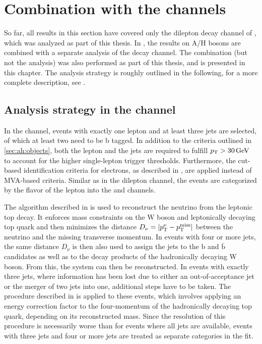 \section{Combination with the \texorpdfstring{\ljets}{l+jets} channels}
\label{sec:ah:combination}

So far, all results in this section have covered only the dilepton decay channel of \ttbar, which was analyzed as part of this thesis. In , the results on A/H bosons are combined with a separate analysis of the \ljets decay channel. The combination (but not the \ljets analysis) was also performed as part of this thesis, and is presented in this chapter. The \ljets analysis strategy is roughly outlined in the following, for a more complete description, see .

\subsection{Analysis strategy in the \texorpdfstring{\ljets}{l+jets} channel}
\label{sec:ah:ljets}

In the \ljets channel, events with exactly one lepton and at least three jets are selected, of which at least two need to be b tagged. In addition to the criteria outlined in \cref{sec:ah:objects}, both the lepton and the jets are required to fulfill $\pt > \SI{30}{\GeV}$ to account for the higher single-lepton trigger thresholds. Furthermore, the cut-based identification criteria for electrons, as described in , are applied instead of MVA-based criteria. Similar as in the dilepton channel, the events are categorized by the flavor of the lepton into the \ejets and \mujets channels.

The algorithm described in  is used to reconstruct the neutrino from the leptonic top decay. It enforces mass constraints on the W boson and leptonically decaying top quark and then minimizes the distance $D_\nu = |p_{\mathrm{T}}^\nu - p_{\mathrm{T}}^{\mathrm{miss}}|$ between the neutrino \pt and the missing transverse momentum. In events with four or more jets, the same distance $D_\nu$ is then also used to assign the jets to the b and $\bar{\mathrm{b}}$ candidates as well as to the decay products of the hadronically decaying W boson. From this, the \ttbar system can then be reconstructed. In events with exactly three jets, where information has been lost due to either an out-of-acceptance jet or the merger of two jets into one, additional steps have to be taken. The procedure described in  is applied to these events, which involves applying an energy correction factor to the four-momentum of the hadronically decaying top quark, depending on its reconstructed mass. Since the resolution of this procedure is necessarily worse than for events where all jets are available, events with three jets and four or more jets are treated as separate categories in the fit.

